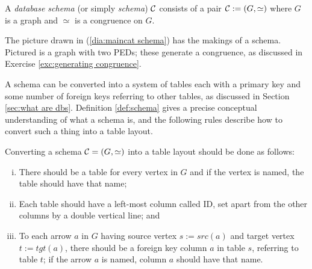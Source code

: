 \documentclass[CT4S-EN-RU]{subfiles}
\begin{document}
\begin{proofRUS}
\end{proofRUS}

\begin{definitionENG}\label{def:schema}
A {\em database schema} (or simply {\em schema}) $\mathcal{C}$ consists of a pair $\mathcal{C}:=(G,\simeq)$ where $G$ is a graph and $\simeq$ is a congruence on $G$. 
\end{definitionENG}

\begin{definitionRUS}\label{def:schema}
\end{definitionRUS}

\begin{exampleENG}
The picture drawn in (\ref{dia:maincat schema}) has the makings of a schema. Pictured is a graph with two PEDs; these generate a congruence, as discussed in Exercise \ref{exc:generating congruence}.  
\end{exampleENG}

\begin{exampleRUS}
\end{exampleRUS}

\begin{blockENG}
A schema can be converted into a system of tables each with a primary key and some number of foreign keys referring to other tables, as discussed in Section \ref{sec:what are dbs}. Definition \ref{def:schema} gives a precise conceptual understanding of what a schema is, and the following rules describe how to convert such a thing into a table layout.
\end{blockENG}

\begin{blockRUS}
\end{blockRUS}

\begin{rulesENG}\label{rules:schema to tables}
Converting a schema $\mathcal{C}=(G,\simeq)$ into a table layout should be done as follows:
\begin{enumerate}[(i)]
\item There should be a table for every vertex in $G$ and if the vertex is named, the table should have that name;
\item Each table should have a left-most column called ID, set apart from the other columns by a double vertical line; and
\item To each arrow $a$ in $G$ having source vertex $s:=src(a)$ and target vertex $t:=tgt(a)$, there should be a foreign key column $a$ in table $s$, referring to table $t$; if the arrow $a$ is named, column $a$ should have that name.
\end{enumerate}
\end{rulesENG}
\end{document}
